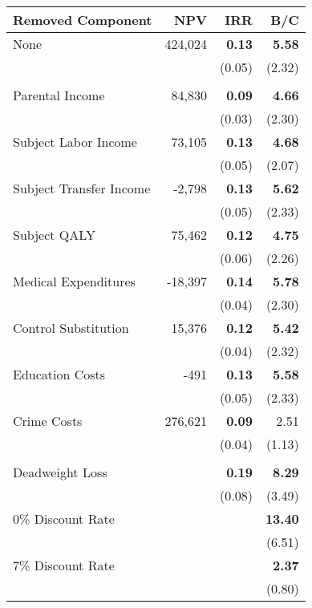 \begin{tabular}{l r r r}																			
\toprule																															
Removed Component       &       NPV     &       IRR     &       B/C     \\																			
\midrule																			
None	&	424,024	&	\textbf{0.13}	&	\textbf{5.58}	\\
	&	&	(0.05)	&	(2.32)	\\ \\
Parental Income	&	84,830	&	\textbf{0.09}	&	\textbf{4.66}	\\
	&		&	(0.03)	&	(2.30)	\\
Subject Labor Income	&	73,105	&	\textbf{0.13}	&	\textbf{4.68}	\\
	&		&	(0.05)	&	(2.07)	\\
Subject Transfer Income	&	-2,798	&	\textbf{0.13}	&	\textbf{5.62}	\\
	&		&	(0.05)	&	(2.33)	\\
Subject QALY	&	75,462	&	\textbf{0.12}	&	\textbf{4.75}	\\
	&		&	(0.06)	&	(2.26)	\\
Medical Expenditures	&	-18,397	&	\textbf{0.14}	&	\textbf{5.78}	\\
	&			&	(0.04)	&	(2.30)	\\
Control Substitution	&		15,376	&	\textbf{0.12}	&	\textbf{5.42}	\\
	&			&	(0.04)	&	(2.32)	\\
Education Costs	&	-491	&	\textbf{0.13}	&	\textbf{5.58}	\\
	&	&	(0.05)	&	(2.33)	\\
Crime Costs	&	276,621	&	\textbf{0.09}	&	2.51	\\
	&		&	(0.04)	&	(1.13)	\\ \\
Deadweight Loss	&		&	\textbf{0.19}	&	\textbf{8.29}	\\
	&		&	(0.08)	&	(3.49)	\\
0\% Discount Rate	&		&		&	\textbf{13.40}	\\
	&		&		&	(6.51)	\\
7\% Discount Rate		&		&		&	\textbf{2.37}	\\
		&		&		&	(0.80)	\\
\bottomrule															
\end{tabular}																			

